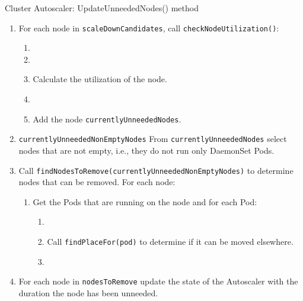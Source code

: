 \begin{algorithm}[ht]
    \caption{Cluster Autoscaler: UpdateUnneededNodes() method}\label{algo:update-unneeded}
    \begin{enumerate}[leftmargin=0.5cm]
        \tightlist
        \item For each node in \texttt{scaleDownCandidates}, call \texttt{checkNodeUtilization()}:
              \begin{enumerate}[]
                  \tightlist
                  \item {}
                  \item {}
                  \item Calculate the utilization of the node.
                  \item {}
                  \item Add the node \texttt{currentlyUnneededNodes}.
              \end{enumerate}
        \item \texttt{currentlyUnneededNonEmptyNodes} \lar From \texttt{currentlyUnneededNodes} select nodes that are not empty, i.e., they do not run only DaemonSet Pods.
        \item Call \texttt{findNodesToRemove(currentlyUnneededNonEmptyNodes)} to determine nodes that can be removed. For each node:
              \begin{enumerate}[]
                  \tightlist%
                  \item Get the Pods that are running on the node and for each Pod:
                        \begin{enumerate}[leftmargin=0.5cm]
                            \tightlist
                            \item {}
                            \item Call \texttt{findPlaceFor(pod)} to determine if it can be moved elsewhere.
                            \item {}
                        \end{enumerate}
              \end{enumerate}
        \item For each node in \texttt{nodesToRemove} update the state of the Autoscaler with the duration the node has been unneeded.
    \end{enumerate}
\end{algorithm}
